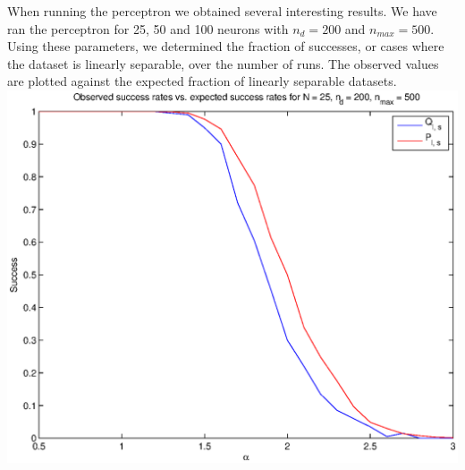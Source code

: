 When running the perceptron we obtained several interesting results. We have ran the perceptron for 25, 50 and 100 neurons with $n_d = 200$ and $n_{max} = 500$. Using these parameters, we determined the fraction of successes, or cases where the dataset is linearly separable, over the number of runs. The observed values are plotted against the expected fraction of linearly separable datasets.
\begingroup
    \centering
    \includegraphics[width=\linewidth]{success_rate_N_25_nd_200_nmax_500.eps}
    \label{fig:25neurons}
\endgroup


